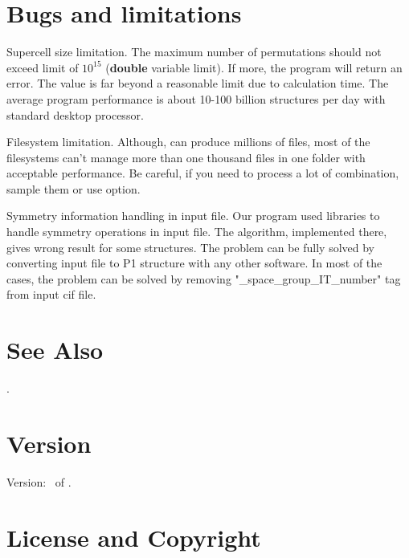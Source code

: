 \documentclass[a4paper,english]{article}
\begin{document}
\section{Bugs and limitations}

\begin{Description}\setlength{\itemsep}{0cm}
\item[Supercell size limitation.]
The maximum number of permutations should not exceed limit of $10^{15}$ (\textbf{double} variable limit). If more, the program will return an error. The value is far beyond a reasonable limit due to calculation time. The average program performance is about 10-100 billion structures per day with standard desktop processor.
\item[Filesystem limitation.]
Although,  can produce millions of files, most of the filesystems can't manage more than one thousand files in one folder with acceptable performance. Be careful, if you need to process a lot of combination, sample them or use  option.
\item[Symmetry information handling in input file.]
Our program used  libraries to handle symmetry operations in input file. The algorithm, implemented there, gives wrong result for some structures. The problem can be fully solved by converting input file to P1 structure with any other software. In most of the cases, the problem can be solved by removing "\_space\_group\_IT\_number" tag from input cif file.

\end{Description}

\section{See Also}

.


\section{Version}

Version: \Version\ of \Date.

\section{License and Copyright}
\end{document}
